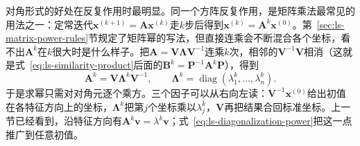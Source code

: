 对角形式的好处在反复作用时最明显。同一个方阵反复作用，是矩阵乘法最常见的用法之一：定常迭代$\bm x^{(k+1)}=\bm A\bm x^{(k)}$走$k$步后得到$\bm x^{(k)}=\bm A^k\bm x^{(0)}$。第~\ref{sec:ls-matrix-power-rules}节规定了矩阵幂的写法，但直接连乘会不断混合各个坐标，看不出$\bm A^k$在$k$很大时是什么样子。把$\bm A=\bm V\bm\Lambda\bm V^{-1}$连乘$k$次，相邻的$\bm V^{-1}\bm V$相消（这就是式~\eqref{eq:ls-similarity-product}后面的$\bm B^k=\bm P^{-1}\bm A^k\bm P$），得到
\begin{equation}
 \bm A^k=\bm V\bm\Lambda^k\bm V^{-1},\qquad
 \bm\Lambda^k=\operatorname{diag}(\lambda_1^k,\ldots,\lambda_n^k).
 \label{eq:ls-diagonalization-power}
\end{equation}
于是求幂只需对对角元逐个乘方。三个因子可以从右向左读：$\bm V^{-1}\bm x^{(0)}$给出初值在各特征方向上的坐标，$\bm\Lambda^k$把第$j$个坐标乘以$\lambda_j^k$，$\bm V$再把结果合回标准坐标。上一节已经看到，沿特征方向有$\bm A^k\bm v=\lambda^k\bm v$；式~\eqref{eq:ls-diagonalization-power}把这一点推广到任意初值。

